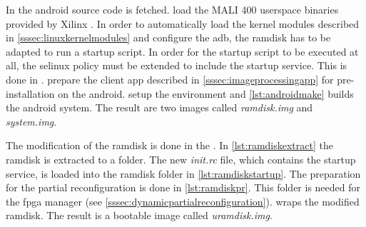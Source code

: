 In  the android source code is fetched.
 load the MALI 400 userspace binaries provided by Xilinx \cite{mali400}. 
In order to automatically load the kernel modules described in \cref{sssec:linuxkernelmodules} and configure the \gls{adb}, the ramdisk has to be adapted to run a startup script. In order for the startup script to be executed at all, the selinux policy must be extended to include the startup service. This is done in .
 prepare the client app described in \cref{sssec:imageprocessingapp} for pre-installation on the android.
 setup the environment and
\cref{lst:androidmake} builds the android system.
The result are two images called \emph{ramdisk.img} and \emph{system.img}.

The modification of the ramdisk is done in the . In \cref{lst:ramdiskextract} the ramdisk is extracted to a folder. The new \emph{init.rc} file, which contains the startup service, is loaded into the ramdisk folder in \cref{lst:ramdiskstartup}. The preparation for the partial reconfiguration is done in \cref{lst:ramdiskpr}. This folder is needed for the \gls{fpga} manager (see \cref{sssec:dynamicpartialreconfiguration}).  wraps the modified ramdisk. The result is a bootable image called \emph{uramdisk.img}.
